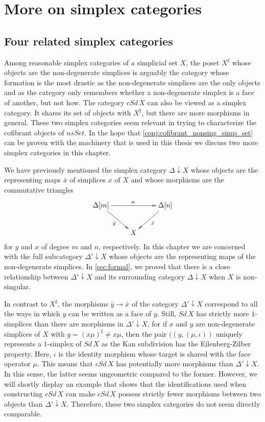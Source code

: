 

\section{More on simplex categories}
\label{sec:simplexcat}

\subsection{Four related simplex categories}


Among reasonable simplex categories of a simplicial set $X$, the poset $X^\sharp$ whose objects are the non-degenerate simplices is arguably the category whose formation is the most drastic as the non-degenerate simplices are the only objects and as the category only remembers whether a non-degenerate simplex is a face of another, but not how. The category $cSd\, X$ can also be viewed as a simplex category. It shares its set of objects with $X^\sharp$, but there are more morphisms in general. These two simplex categories seem relevant in trying to characterize the cofibrant objects of $nsSet$. In the hope that \cref{conj:cofibrant_nonsing_simp_set} can be proven with the machinery that is used in this thesis we discuss two more simplex categories in this chapter.

We have previously mentioned the simplex category $\Delta \downarrow X$ whose objects are the representing maps $\bar{x}$ of simplices $x$ of $X$ and whose morphisms are the commutative triangles
\begin{displaymath}
\xymatrix{
\Delta [m] \ar[dr]_{\bar{y} } \ar[rr]^\alpha && \Delta [n] \ar[ld]^{\bar{x} } \\
& X
}
\end{displaymath}
for $y$ and $x$ of degree $m$ and $n$, respectively. In this chapter we are concerned with the full subcategory $\Delta '\downarrow X$ whose objects are the representing maps of the non-degenerate simplices. In \cref{sec:formal}, we proved that there is a close relationship between $\Delta '\downarrow X$ and its surrounding category $\Delta \downarrow X$ when $X$ is non-singular.

In contrast to $X^\sharp$, the morphisms $\bar{y} \to \bar{x}$ of the category $\Delta '\downarrow X$ correspond to all the ways in which $y$ can be written as a face of $y$. Still, $Sd\, X$ has strictly more $1$-simplices than there are morphisms in $\Delta '\downarrow X$, for if $x$ and $y$ are non-degenerate simplices of $X$ with $y=(x\mu )^\sharp \neq x\mu$, then the pair $((y,(\mu ,\iota ))$ uniquely represents a $1$-simplex of $Sd\, X$ as the Kan subdivision has the Eilenberg-Zilber property. Here, $\iota$ is the identity morphism whose target is shared with the face operator $\mu$. This means that $cSd\, X$ has potentially more morphisms than $\Delta '\downarrow X$. In this sense, the latter seems ungeometric compared to the former. However, we will shortly display an example that shows that the identifications used when constructing $cSd\, X$ can make $cSd\, X$ possess strictly fewer morphisms between two objects than $\Delta '\downarrow X$. Therefore, these two simplex categories do not seem directly comparable.

